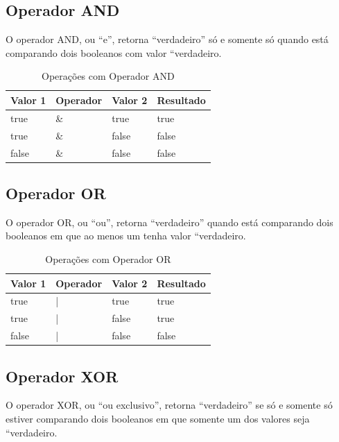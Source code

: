 \documentclass[
]{book}
\begin{document}
\hypertarget{operador-and}{%
\subsection{Operador AND}\label{operador-and}}

O operador AND, ou ``e'', retorna ``verdadeiro'' só e somente só quando está comparando dois booleanos com valor ``verdadeiro.

\begin{table}

\caption{\label{tab:unnamed-chunk-9}Operações com Operador AND}
\centering
\begin{tabular}[t]{l|l|l|l}
\hline
Valor 1 & Operador & Valor 2 & Resultado\\
\hline
true & \& & true & true\\
\hline
true & \& & false & false\\
\hline
false & \& & false & false\\
\hline
\end{tabular}
\end{table}

\hypertarget{operador-or}{%
\subsection{Operador OR}\label{operador-or}}

O operador OR, ou ``ou'', retorna ``verdadeiro'' quando está comparando dois booleanos em que ao menos um tenha valor ``verdadeiro.

\begin{table}

\caption{\label{tab:unnamed-chunk-10}Operações com Operador OR}
\centering
\begin{tabular}[t]{l|l|l|l}
\hline
Valor 1 & Operador & Valor 2 & Resultado\\
\hline
true & | & true & true\\
\hline
true & | & false & true\\
\hline
false & | & false & false\\
\hline
\end{tabular}
\end{table}

\hypertarget{operador-xor}{%
\subsection{Operador XOR}\label{operador-xor}}

O operador XOR, ou ``ou exclusivo'', retorna ``verdadeiro'' se só e somente só estiver comparando dois booleanos em que somente um dos valores seja ``verdadeiro.
\end{document}
